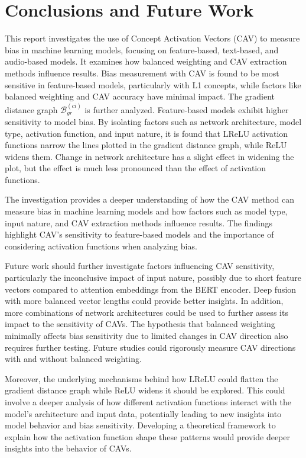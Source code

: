 \chapter{Conclusions and Future Work} \label{chap:conclusions}

This report investigates the use of Concept Activation Vectors (CAV) to measure bias in machine learning models, focusing on feature-based, text-based, and audio-based models. It examines how balanced weighting and CAV extraction methods influence results. Bias measurement with CAV is found to be most sensitive in feature-based models, particularly with L1 concepts, while factors like balanced weighting and CAV accuracy have minimal impact. The gradient distance graph $\mathcal{B}^{(ci)}_{gr}$ is further analyzed. Feature-based models exhibit higher sensitivity to model bias. By isolating factors such as network architecture, model type, activation function, and input nature, it is found that LReLU activation functions narrow the lines plotted in the gradient distance graph, while ReLU widens them. Change in network architecture has a slight effect in widening the plot, but the effect is much less pronounced than the effect of activation functions.

The investigation provides a deeper understanding of how the CAV method can measure bias in machine learning models and how factors such as model type, input nature, and CAV extraction methods influence results. The findings highlight CAV's sensitivity to feature-based models and the importance of considering activation functions when analyzing bias.

Future work should further investigate factors influencing CAV sensitivity, particularly the inconclusive impact of input nature, possibly due to short feature vectors compared to attention embeddings from the BERT encoder. Deep fusion with more balanced vector lengths could provide better insights. In addition, more combinations of network architectures could be used to further assess its impact to the sensitivity of CAVs. The hypothesis that balanced weighting minimally affects bias sensitivity due to limited changes in CAV direction also requires further testing. Future studies could rigorously measure CAV directions with and without balanced weighting.

Moreover, the underlying mechanisms behind how LReLU could flatten the gradient distance graph while ReLU widens it should be explored. This could involve a deeper analysis of how different activation functions interact with the model's architecture and input data, potentially leading to new insights into model behavior and bias sensitivity. Developing a theoretical framework to explain how the activation function shape these patterns would provide deeper insights into the behavior of CAVs.
